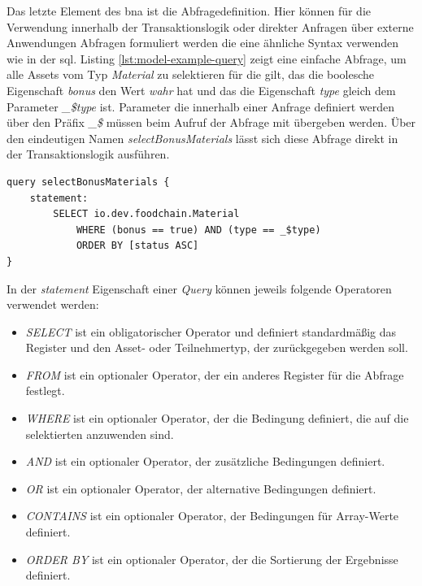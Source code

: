 \noindent
Das letzte Element des \acf{bna} ist die Abfragedefinition. Hier können für die Verwendung innerhalb der Transaktionslogik oder direkter Anfragen über externe Anwendungen Abfragen formuliert werden die eine ähnliche Syntax verwenden wie in der \ac{sql}. Listing \ref{lst:model-example-query} zeigt eine einfache Abfrage, um alle Assets vom Typ \textit{Material} zu selektieren für die gilt, das die boolesche Eigenschaft \textit{bonus} den Wert \textit{wahr} hat und das die Eigenschaft \textit{type} gleich dem Parameter \textit{\_\$type} ist. Parameter die innerhalb einer Anfrage definiert werden über den Präfix \textit{\_\$} müssen beim Aufruf der Abfrage mit übergeben werden. Über den eindeutigen Namen \textit{selectBonusMaterials} lässt sich diese Abfrage direkt in der Transaktionslogik ausführen.

\begin{lstlisting}[caption={Abfragedefinition},label=lst:model-example-query]
query selectBonusMaterials {
    statement:
        SELECT io.dev.foodchain.Material
            WHERE (bonus == true) AND (type == _$type)
            ORDER BY [status ASC]
}
\end{lstlisting}

\noindent
In der \textit{statement} Eigenschaft einer \textit{Query} können jeweils folgende Operatoren verwendet werden:

\begin{itemize}
    \item \textit{SELECT} ist ein obligatorischer Operator und definiert standardmäßig das Register und den Asset- oder Teilnehmertyp, der zurückgegeben werden soll.
    \item \textit{FROM} ist ein optionaler Operator, der ein anderes Register für die Abfrage festlegt.
    \item \textit{WHERE} ist ein optionaler Operator, der die Bedingung definiert, die auf die selektierten anzuwenden sind.
    \item \textit{AND} ist ein optionaler Operator, der zusätzliche Bedingungen definiert.
    \item \textit{OR} ist ein optionaler Operator, der alternative Bedingungen definiert.
    \item \textit{CONTAINS} ist ein optionaler Operator, der Bedingungen für Array-Werte definiert.
    \item \textit{ORDER BY} ist ein optionaler Operator, der die Sortierung der Ergebnisse definiert.
\end{itemize}

